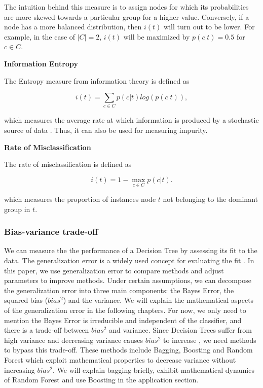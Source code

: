 The intuition behind this measure is to assign nodes 
for which its probabilities are more skewed towards a particular group for a higher value.
Conversely, if a node has a more balanced distribution, then \(i(t)\) will turn out to be lower.
For example, in the case of \( |C|=2 \), \(i(t)\) will be maximized by \( p(c|t) = 0.5 \) for \( c \in C \).


\textbf{Information Entropy}

The Entropy measure from information theory is defined as

\begin{equation}
    i(t) = \sum_{c \in C} p(c|t) log(p(c|t)),
\end{equation}

which measures the average rate at which information is produced by a stochastic source of data .
Thus, it can also be used for measuring impurity.


\textbf{Rate of Misclassification}

The rate of misclassification is defined as 

\begin{equation}
    i(t) = 1 - \max_{c \in C} p(c|t) .
\end{equation}

which measures the proportion of instances node \(t\) not belonging to the dominant group in \(t\).


\subsubsection{Bias-variance trade-off}
We can measure the the performance of a Decision Tree by assessing its fit to the data. 
The generalization error is a widely used concept for evaluating the fit \cite{breiman2001random}.
In this paper, we use generalization error to compare methods and adjust parameters to improve methods. 
Under certain assumptions, we can decompose the generalization error into three main components:
the Bayes Error, the squared bias ($bias^2$) and the variance. 
We will explain the mathematical aspects of the generalization error in the following chapters. 
For now, we only need to mention the Bayes Error is irreducible and independent of the classifier, 
and there is a trade-off between $bias^2$ and variance. Since Decision Trees suffer from high variance and 
decreasing variance causes $bias^2$ to increase \cite{geman1992neural}, we need methods to bypass this trade-off. 
These methods include Bagging, Boosting and Random Forest 
which exploit mathematical properties to decrease variance without increasing $bias^2$. 
We will explain bagging briefly, exhibit mathematical dynamics of Random Forest and 
use Boosting in the application section.


